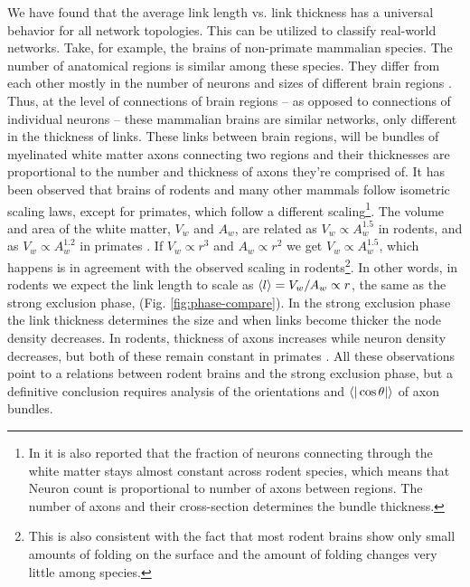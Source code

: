 \documentclass[nofootinbib,preprint,floatfix,titlepage,endfloats]{revtex4} %
\begin{document}
We have found that the average link length vs. link thickness has a universal behavior for all network topologies. 
This can be utilized to classify real-world networks. 
Take, for example, the brains of non-primate mammalian species. 
The number of anatomical regions is similar among these species. 
They differ from each other mostly in the number of neurons and sizes of different brain regions \cite{azevedo2009equal, herculano2012remarkable, herculano2014brain}. 
Thus, at the level of connections of brain regions -- as opposed to connections of individual neurons -- these mammalian brains are similar networks, only different in the thickness of links. 
These links 
between brain regions, will be bundles of myelinated white matter axons connecting two regions and their thicknesses are proportional to the number and thickness of axons they're comprised of. 
It has been observed that brains of rodents \cite{herculano2012remarkable} and many other mammals \cite{herculano2014brain} follow isometric scaling laws, except for primates, which follow a different scaling\footnote{In \cite{herculano2012remarkable} it is also reported that the fraction of neurons connecting through the white matter stays almost constant across rodent species, which means that Neuron count is proportional to number of axons between regions. The number of axons and their cross-section determines the bundle thickness.}. 
The volume and area of the white matter, $V_w$ and $A_w$, are related as $V_w\propto A_w^{1.5}$ in rodents, and as $V_w \propto A_w^{1.2}$ in primates  \cite{herculano2012remarkable}. 
If $V_w \propto r^3$ and $A_w \propto r^2$ we get $V_w \propto A_w^{1.5}$, which happens is in agreement with the observed scaling in rodents\footnote{This is also consistent with the fact that most rodent brains show only small amounts of folding on the surface and the amount of folding changes very little among species.}. In other words, in rodents we expect the link length to scale as $ \left<l\right> = V_w/A_w \propto r $, the same as the strong exclusion phase, (Fig. \ref{fig:phase-compare}). 
In the strong exclusion phase the link thickness determines the size and when links become thicker the node density decreases. 
In rodents, thickness of axons increases while neuron density decreases, but both of these remain constant in primates \cite{herculano2012remarkable}. 
All these observations point to a relations between rodent brains and the strong exclusion phase, but a definitive conclusion requires analysis of the orientations and $\be{|\cos\theta|}$ of axon bundles.%
\end{document}
